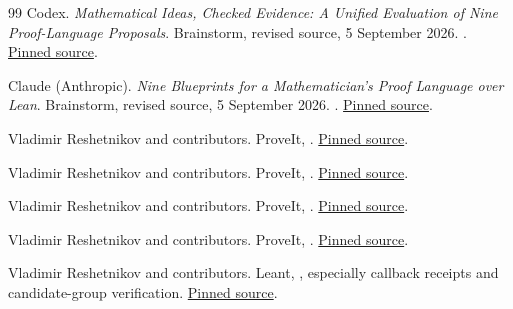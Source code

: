 \documentclass[11pt,a4paper]{article}
\theoremstyle{remark}\newtheorem{example}[proposition]{Example}
\begin{document}
\begin{thebibliography}{99}
\small
{}
Codex. \emph{Mathematical Ideas, Checked Evidence: A Unified Evaluation of Nine Proof-Language Proposals}. Brainstorm, revised source, 5 September 2026.
.
\href{https://github.com/VladimirReshetnikov/Brainstorm/blob/494be9d5ab41a5ae219fc6f800e6aee3c93bce39/docs/synthesis/unified-report.tex}{Pinned source}.

Claude (Anthropic). \emph{Nine Blueprints for a Mathematician's Proof Language over Lean}. Brainstorm, revised source, 5 September 2026.
.
\href{https://github.com/VladimirReshetnikov/Brainstorm/blob/494be9d5ab41a5ae219fc6f800e6aee3c93bce39/docs/unified_report/unified_report.tex}{Pinned source}.

Vladimir Reshetnikov and contributors. ProveIt, .
\href{https://github.com/VladimirReshetnikov/ProveIt/blob/24ce8bd743eaab64a91ce90725ea00f498d319d2/Analysis/FabiusFunction/Lean/FabiusFunction/BinomialInversion.lean}{Pinned source}.

Vladimir Reshetnikov and contributors. ProveIt, .
\href{https://github.com/VladimirReshetnikov/ProveIt/blob/24ce8bd743eaab64a91ce90725ea00f498d319d2/Analysis/FabiusFunction/Lean/FabiusFunction/AutonomousIteratedDeriv.lean}{Pinned source}.

Vladimir Reshetnikov and contributors. ProveIt, .
\href{https://github.com/VladimirReshetnikov/ProveIt/blob/24ce8bd743eaab64a91ce90725ea00f498d319d2/Analysis/FabiusFunction/Lean/FabiusFunction/AbelPolynomialSeries.lean}{Pinned source}.

Vladimir Reshetnikov and contributors. ProveIt, .
\href{https://github.com/VladimirReshetnikov/ProveIt/blob/24ce8bd743eaab64a91ce90725ea00f498d319d2/NumberTheory/IntegerSums/Lean/IntegerSums/FloorSqrtSum.lean}{Pinned source}.

Vladimir Reshetnikov and contributors. Leant, , especially callback receipts and candidate-group verification.
\href{https://github.com/VladimirReshetnikov/Leant/blob/3a40904be8a410d832d9ab6900b3d3e7b425eccb/src/Leant/Synth/Verification.hs}{Pinned source}.


\end{thebibliography}
\end{document}
